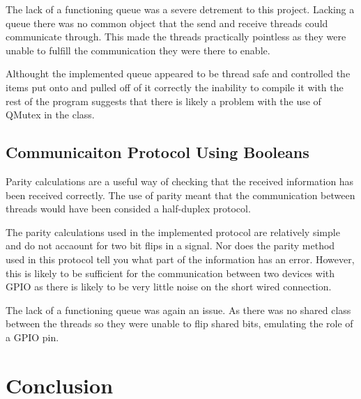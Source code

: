 \documentclass[10pt]{article}
\begin{document}
\begin{multicols*}{2}
The lack of a functioning queue was a severe detrement to this project. Lacking a queue there was no common object that the send and receive threads could communicate through. This made the threads practically pointless as they were unable to fulfill the communication they were there to enable.

Althought the implemented queue appeared to be thread safe and controlled the items put onto and pulled off of it correctly the inability to compile it with the rest of the program suggests that there is likely a problem with the use of QMutex in the class.

\subsection{Communicaiton Protocol Using Booleans}
Parity calculations are a useful way of checking that the received information has been received correctly. The use of parity meant that the communication between threads would have been consided a half-duplex protocol.

The parity calculations used in the implemented protocol are relatively simple and do not accaount for two bit flips in a signal. Nor does the parity method used in this protocol tell you what part of the information has an error. However, this is likely to be sufficient for the communication between two devices with GPIO as there is likely to be very little noise on the short wired connection.

The lack of a functioning queue was again an issue. As there was no shared class between the threads so they were unable to flip shared bits, emulating the role of a GPIO pin.

\section{Conclusion}


\nocite{*} %



\end{multicols*}
\end{document}
